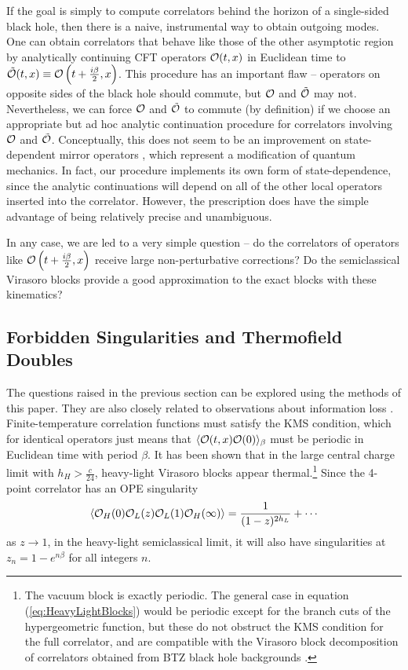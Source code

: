 \documentclass[12pt]{article}
\numberwithin{equation}{section}
\def\>{\rangle}
\def\<{\langle}
\newcommand{\be}{\begin{eqnarray}}
\newcommand{\ee}{\end{eqnarray}}
\newcommand{\CO}{{\cal O}}
\begin{document}
If the goal is simply to compute correlators behind the horizon of a single-sided black hole, then there is a naive, instrumental way to obtain outgoing modes.  One can obtain correlators that behave like those of the other asymptotic region by analytically continuing \cite{Hamilton:2005ju} CFT operators $\CO(t, x)$ in Euclidean time to $\tilde \CO(t, x) \equiv \CO \left(t + \frac{i \beta}{2}, x \right)$.  This procedure has an important flaw -- operators on opposite sides of the black hole should  commute, but $\CO$ and $\tilde \CO$ may not. Nevertheless, we can force $\CO$ and $\tilde \CO$ to commute (by definition) if we choose an appropriate but ad hoc analytic continuation procedure for correlators involving $\CO$ and $\tilde \CO$.  Conceptually, this does not seem to be an improvement on state-dependent mirror operators \cite{Papadodimas:2012aq, Papadodimas:2013jku}, which represent a modification of quantum mechanics.  In fact, our procedure implements its own form of state-dependence, since the analytic continuations will depend on all of the other local operators inserted into the correlator.  However, the prescription does have the simple advantage of being relatively precise and unambiguous.

In any case, we are led to a very simple question -- do the correlators of operators like $\CO \left(t + \frac{i \beta}{2}, x \right)$ receive large non-perturbative corrections?  Do the semiclassical Virasoro blocks provide a good approximation to the exact blocks with these kinematics?  

\subsection{Forbidden Singularities and Thermofield Doubles}

The questions raised in the previous section can be explored using the methods of this paper.  They are also closely related to observations about information loss \cite{Fitzpatrick:2016ive}.  Finite-temperature correlation functions must satisfy the KMS condition, which for identical operators just means that $\< \CO(t, x) \CO(0) \>_\beta$  must be periodic in Euclidean time with period $\beta$.  It has been shown that in the large central charge limit with $h_H > \frac{c}{24}$, heavy-light Virasoro blocks appear thermal.\footnote{The vacuum block is exactly periodic.  The general case in equation (\ref{eq:HeavyLightBlocks}) would be periodic except for the branch cuts of the hypergeometric function, but these do not obstruct the KMS condition for the full correlator, and are compatible with the Virasoro block decomposition of correlators obtained from BTZ black hole backgrounds \cite{Fitzpatrick:2015zha}.}  Since the 4-point correlator has an OPE singularity
\be
\< \CO_H(0) \CO_L(z) \CO_L(1) \CO_H(\infty) \> = \frac{1}{(1-z)^{2h_L}} + \cdots
\ee
as $z \to 1$, in the heavy-light semiclassical limit, it will also have singularities at $z_n = 1 - e^{n \beta}$ for all integers $n$.   
\end{document}
